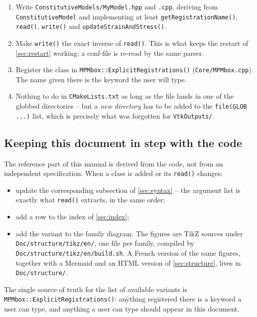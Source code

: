 \documentclass[a4paper,onecolumn,11pt]{doofus}
\begin{document}
\begin{enumerate}
\item Write \texttt{ConstitutiveModels/MyModel.hpp} and \texttt{.cpp}, deriving from
      \texttt{ConstitutiveModel} and implementing at least \texttt{getRegistrationName()},
      \texttt{read()}, \texttt{write()} and \texttt{updateStrainAndStress()}.
\item Make \texttt{write()} the exact inverse of \texttt{read()}. This is what keeps the restart
      of \cref{sec:restart} working: a conf-file is re-read by the same parser.
\item Register the class in \texttt{MPMbox::ExplicitRegistrations()}
      (\texttt{Core/MPMbox.cpp}). The name given there is the keyword the user will type.
\item Nothing to do in \texttt{CMakeLists.txt} as long as the file lands in one of the globbed
      directories -- but a \emph{new directory} has to be added to the \texttt{file(GLOB ...)}
      list, which is precisely what was forgotten for \texttt{VtkOutputs/}.
\end{enumerate}

\subsection{Keeping this document in step with the code}

The reference part of this manual is derived from the code, not from an independent
specification. When a class is added or its \texttt{read()} changes:

\begin{itemize}
\item update the corresponding subsection of \cref{sec:syntax} -- the argument list is exactly
      what \texttt{read()} extracts, in the same order;
\item add a row to the index of \cref{sec:index};
\item add the variant to the family diagram. The figures are TikZ sources under
      \texttt{Doc/structure/tikz/en/}, one file per family, compiled by
      \texttt{Doc/structure/tikz/en/build.sh}. A French version of the same figures, together
      with a Mermaid and an HTML version of \cref{sec:structure}, lives in
      \texttt{Doc/structure/}.
\end{itemize}

The single source of truth for the list of available variants is
\texttt{MPMbox::ExplicitRegistrations()}: anything registered there is a keyword a user can
type, and anything a user can type should appear in this document.
\end{document}
